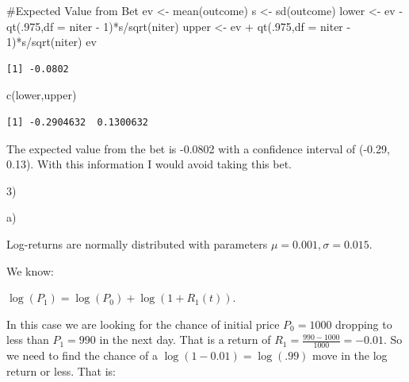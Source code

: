 \documentclass[
  letterpaper,
  DIV=11,
  numbers=noendperiod]{scrartcl}
\newenvironment{Shaded}{\begin{snugshade}}{\end{snugshade}}
\newcommand{\AttributeTok}[1]{\textcolor[rgb]{0.40,0.45,0.13}{#1}}
\newcommand{\CommentTok}[1]{\textcolor[rgb]{0.37,0.37,0.37}{#1}}
\newcommand{\DecValTok}[1]{\textcolor[rgb]{0.68,0.00,0.00}{#1}}
\newcommand{\FunctionTok}[1]{\textcolor[rgb]{0.28,0.35,0.67}{#1}}
\newcommand{\NormalTok}[1]{\textcolor[rgb]{0.00,0.23,0.31}{#1}}
\newcommand{\OtherTok}[1]{\textcolor[rgb]{0.00,0.23,0.31}{#1}}
\newcommand{\SpecialCharTok}[1]{\textcolor[rgb]{0.37,0.37,0.37}{#1}}
\begin{document}
\begin{Shaded}
\begin{Highlighting}[]
\CommentTok{\#Expected Value from Bet}
\NormalTok{ev }\OtherTok{\textless{}{-}} \FunctionTok{mean}\NormalTok{(outcome)}
\NormalTok{s }\OtherTok{\textless{}{-}} \FunctionTok{sd}\NormalTok{(outcome)}
\NormalTok{lower }\OtherTok{\textless{}{-}}\NormalTok{ ev }\SpecialCharTok{{-}} \FunctionTok{qt}\NormalTok{(.}\DecValTok{975}\NormalTok{,}\AttributeTok{df =}\NormalTok{ niter }\SpecialCharTok{{-}} \DecValTok{1}\NormalTok{)}\SpecialCharTok{*}\NormalTok{s}\SpecialCharTok{/}\FunctionTok{sqrt}\NormalTok{(niter)}
\NormalTok{upper }\OtherTok{\textless{}{-}}\NormalTok{ ev }\SpecialCharTok{+} \FunctionTok{qt}\NormalTok{(.}\DecValTok{975}\NormalTok{,}\AttributeTok{df =}\NormalTok{ niter }\SpecialCharTok{{-}} \DecValTok{1}\NormalTok{)}\SpecialCharTok{*}\NormalTok{s}\SpecialCharTok{/}\FunctionTok{sqrt}\NormalTok{(niter)}
\NormalTok{ev}
\end{Highlighting}
\end{Shaded}

\begin{verbatim}
[1] -0.0802
\end{verbatim}

\begin{Shaded}
\begin{Highlighting}[]
\FunctionTok{c}\NormalTok{(lower,upper)}
\end{Highlighting}
\end{Shaded}

\begin{verbatim}
[1] -0.2904632  0.1300632
\end{verbatim}

The expected value from the bet is -0.0802 with a confidence interval of
(-0.29, 0.13). With this information I would avoid taking this bet.

3)

a)

Log-returns are normally distributed with parameters
\(\mu = 0.001, \sigma = 0.015\).

We know:

\(\log(P_1)=\log(P_0)+\log(1 + R_1(t))\).

In this case we are looking for the chance of initial price \(P_0=1000\)
dropping to less than \(P_1=990\) in the next day. That is a return of
\(R_1=\frac{990-1000}{1000}=-0.01\). So we need to find the chance of a
\(\log(1 -0.01)=\log(.99)\) move in the log return or less. That is:
\end{document}
